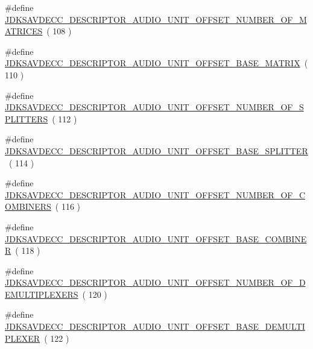 \begin{DoxyCompactItemize}
\item 
\#define \hyperlink{group__descriptor__audio_ga47ad6bbdbcea154efaa2c16955e7019f}{J\+D\+K\+S\+A\+V\+D\+E\+C\+C\+\_\+\+D\+E\+S\+C\+R\+I\+P\+T\+O\+R\+\_\+\+A\+U\+D\+I\+O\+\_\+\+U\+N\+I\+T\+\_\+\+O\+F\+F\+S\+E\+T\+\_\+\+N\+U\+M\+B\+E\+R\+\_\+\+O\+F\+\_\+\+M\+A\+T\+R\+I\+C\+ES}~( 108 )
\item 
\#define \hyperlink{group__descriptor__audio_ga517f74d9eb0a7433dc6b91634f67365e}{J\+D\+K\+S\+A\+V\+D\+E\+C\+C\+\_\+\+D\+E\+S\+C\+R\+I\+P\+T\+O\+R\+\_\+\+A\+U\+D\+I\+O\+\_\+\+U\+N\+I\+T\+\_\+\+O\+F\+F\+S\+E\+T\+\_\+\+B\+A\+S\+E\+\_\+\+M\+A\+T\+R\+IX}~( 110 )
\item 
\#define \hyperlink{group__descriptor__audio_ga1c8ffae2935281bf3864497c0233510e}{J\+D\+K\+S\+A\+V\+D\+E\+C\+C\+\_\+\+D\+E\+S\+C\+R\+I\+P\+T\+O\+R\+\_\+\+A\+U\+D\+I\+O\+\_\+\+U\+N\+I\+T\+\_\+\+O\+F\+F\+S\+E\+T\+\_\+\+N\+U\+M\+B\+E\+R\+\_\+\+O\+F\+\_\+\+S\+P\+L\+I\+T\+T\+E\+RS}~( 112 )
\item 
\#define \hyperlink{group__descriptor__audio_gac054c3858abc2b9fb2c0c0f51797240d}{J\+D\+K\+S\+A\+V\+D\+E\+C\+C\+\_\+\+D\+E\+S\+C\+R\+I\+P\+T\+O\+R\+\_\+\+A\+U\+D\+I\+O\+\_\+\+U\+N\+I\+T\+\_\+\+O\+F\+F\+S\+E\+T\+\_\+\+B\+A\+S\+E\+\_\+\+S\+P\+L\+I\+T\+T\+ER}~( 114 )
\item 
\#define \hyperlink{group__descriptor__audio_gae278bfbce07300e88e2592011ca12777}{J\+D\+K\+S\+A\+V\+D\+E\+C\+C\+\_\+\+D\+E\+S\+C\+R\+I\+P\+T\+O\+R\+\_\+\+A\+U\+D\+I\+O\+\_\+\+U\+N\+I\+T\+\_\+\+O\+F\+F\+S\+E\+T\+\_\+\+N\+U\+M\+B\+E\+R\+\_\+\+O\+F\+\_\+\+C\+O\+M\+B\+I\+N\+E\+RS}~( 116 )
\item 
\#define \hyperlink{group__descriptor__audio_ga4b8ad6660daaf6642215c2912d45de6c}{J\+D\+K\+S\+A\+V\+D\+E\+C\+C\+\_\+\+D\+E\+S\+C\+R\+I\+P\+T\+O\+R\+\_\+\+A\+U\+D\+I\+O\+\_\+\+U\+N\+I\+T\+\_\+\+O\+F\+F\+S\+E\+T\+\_\+\+B\+A\+S\+E\+\_\+\+C\+O\+M\+B\+I\+N\+ER}~( 118 )
\item 
\#define \hyperlink{group__descriptor__audio_ga7129cd0f36a98ea341f3da1551a64a4a}{J\+D\+K\+S\+A\+V\+D\+E\+C\+C\+\_\+\+D\+E\+S\+C\+R\+I\+P\+T\+O\+R\+\_\+\+A\+U\+D\+I\+O\+\_\+\+U\+N\+I\+T\+\_\+\+O\+F\+F\+S\+E\+T\+\_\+\+N\+U\+M\+B\+E\+R\+\_\+\+O\+F\+\_\+\+D\+E\+M\+U\+L\+T\+I\+P\+L\+E\+X\+E\+RS}~( 120 )
\item 
\#define \hyperlink{group__descriptor__audio_ga88000f385af79151661d890d62e56275}{J\+D\+K\+S\+A\+V\+D\+E\+C\+C\+\_\+\+D\+E\+S\+C\+R\+I\+P\+T\+O\+R\+\_\+\+A\+U\+D\+I\+O\+\_\+\+U\+N\+I\+T\+\_\+\+O\+F\+F\+S\+E\+T\+\_\+\+B\+A\+S\+E\+\_\+\+D\+E\+M\+U\+L\+T\+I\+P\+L\+E\+X\+ER}~( 122 )
\item 

\end{DoxyCompactItemize}
